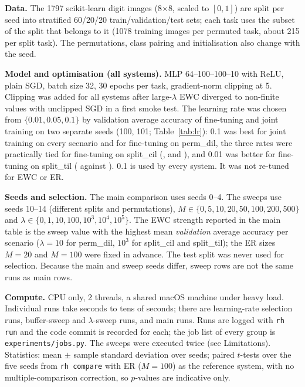 \textbf{Data.} The 1797 scikit-learn digit images (8$\times$8, scaled to $[0,1]$) are split per seed into stratified 60/20/20 train/validation/test sets; each task uses the subset of the split that belongs to it (1078 training images per permuted task, about 215 per split task). The permutations, class pairing and initialisation also change with the seed.

\textbf{Model and optimisation (all systems).} MLP 64--100--100--10 with ReLU, plain SGD, batch size 32, 30 epochs per task, gradient-norm clipping at 5. Clipping was added for all systems after large-$\lambda$ EWC diverged to non-finite values with unclipped SGD in a first smoke test. The learning rate was chosen from $\{0.01,0.05,0.1\}$ by validation average accuracy of fine-tuning and joint training on two separate seeds (100, 101; Table~\ref{tab:lr}): 0.1 was best for joint training on every scenario and for fine-tuning on perm\_dil, the three rates were practically tied for fine-tuning on split\_cil (,  and ), and 0.01 was better for fine-tuning on split\_til ( against ). 0.1 is used by every system. It was not re-tuned for EWC or ER.

\begin{table}[t]\centering\caption{Learning-rate selection: validation average accuracy, mean $\pm$ std over seeds 100 and 101.}\label{tab:lr}
\resizebox{\columnwidth}{!}{}
\end{table}

\textbf{Seeds and selection.} The main comparison uses seeds 0--4. The sweeps use seeds 10--14 (different splits and permutations), $M\in\{0,5,10,20,50,100,200,500\}$ and $\lambda\in\{0,1,10,100,10^3,10^4,10^5\}$. The EWC strength reported in the main table is the sweep value with the highest mean \emph{validation} average accuracy per scenario ($\lambda{=}10$ for perm\_dil, $10^3$ for split\_cil and split\_til); the ER sizes $M{=}20$ and $M{=}100$ were fixed in advance. The test split was never used for selection. Because the main and sweep seeds differ, sweep rows are not the same runs as main rows.

\textbf{Compute.} CPU only, 2 threads, a shared macOS machine under heavy load. Individual runs take seconds to tens of seconds; there are  learning-rate selection runs,  buffer-sweep and  $\lambda$-sweep runs, and  main runs. Runs are logged with \texttt{rh run} and the code commit is recorded for each; the job list of every group is \texttt{experiments/jobs.py}. The sweeps were executed twice (see Limitations). Statistics: mean $\pm$ sample standard deviation over seeds; paired $t$-tests over the five seeds from \texttt{rh compare} with ER ($M{=}100$) as the reference system, with no multiple-comparison correction, so $p$-values are indicative only.
